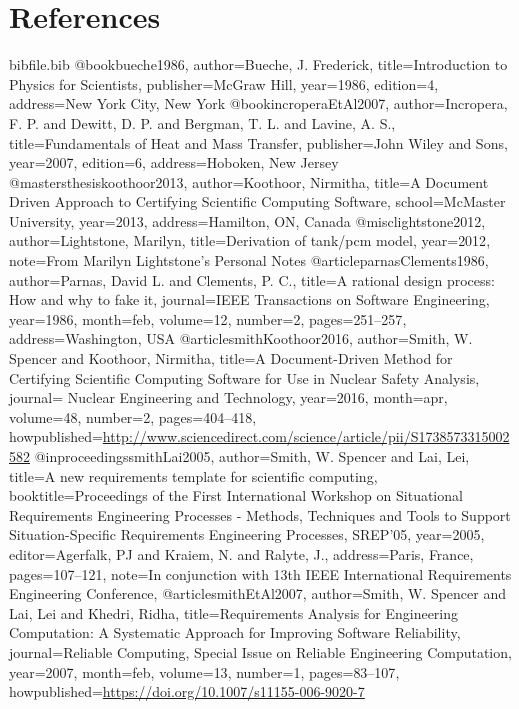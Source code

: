 \documentclass[12pt]{article}
\begin{document}
\section{References}
\label{Sec:References}
\begin{filecontents*}{bibfile.bib}
@book{bueche1986,
author={Bueche, J. Frederick},
title={Introduction to Physics for Scientists},
publisher={McGraw Hill},
year={1986},
edition={4},
address={New York City, New York}}
@book{incroperaEtAl2007,
author={Incropera, F. P. and Dewitt, D. P. and Bergman, T. L. and Lavine, A. S.},
title={Fundamentals of Heat and Mass Transfer},
publisher={John Wiley and Sons},
year={2007},
edition={6},
address={Hoboken, New Jersey}}
@mastersthesis{koothoor2013,
author={Koothoor, Nirmitha},
title={A Document Driven Approach to Certifying Scientific Computing Software},
school={McMaster University},
year={2013},
address={Hamilton, ON, Canada}}
@misc{lightstone2012,
author={Lightstone, Marilyn},
title={Derivation of tank/pcm model},
year={2012},
note={From Marilyn Lightstone's Personal Notes}}
@article{parnasClements1986,
author={Parnas, David L. and Clements, P. C.},
title={A rational design process: How and why to fake it},
journal={IEEE Transactions on Software Engineering},
year={1986},
month=feb,
volume={12},
number={2},
pages={251--257},
address={Washington, USA}}
@article{smithKoothoor2016,
author={Smith, W. Spencer and Koothoor, Nirmitha},
title={A Document-Driven Method for Certifying Scientific Computing Software for Use in Nuclear Safety Analysis},
journal={ Nuclear Engineering and Technology},
year={2016},
month=apr,
volume={48},
number={2},
pages={404--418},
howpublished={\url{http://www.sciencedirect.com/science/article/pii/S1738573315002582}}}
@inproceedings{smithLai2005,
author={Smith, W. Spencer and Lai, Lei},
title={A new requirements template for scientific computing},
booktitle={Proceedings of the First International Workshop on Situational Requirements Engineering Processes - Methods, Techniques and Tools to Support Situation-Specific Requirements Engineering Processes, SREP'05},
year={2005},
editor={Agerfalk, PJ and Kraiem, N. and Ralyte, J.},
address={Paris, France},
pages={107--121},
note={In conjunction with 13th IEEE International Requirements Engineering Conference,}}
@article{smithEtAl2007,
author={Smith, W. Spencer and Lai, Lei and Khedri, Ridha},
title={Requirements Analysis for Engineering Computation: A Systematic Approach for Improving Software Reliability},
journal={Reliable Computing, Special Issue on Reliable Engineering Computation},
year={2007},
month=feb,
volume={13},
number={1},
pages={83--107},
howpublished={\url{https://doi.org/10.1007/s11155-006-9020-7}}}
\end{filecontents*}
\nocite{*}
\printbibliography[heading=none]
\end{document}
